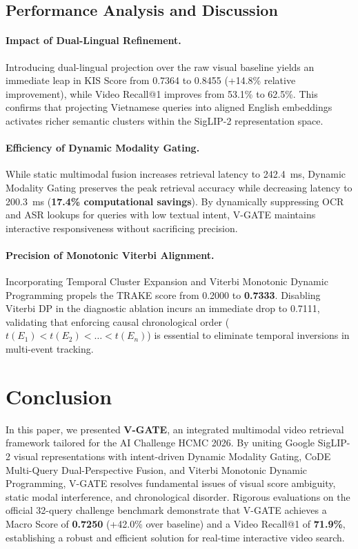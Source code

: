 \documentclass[runningheads]{llncs}
\begin{document}
\subsection{Performance Analysis and Discussion}
\paragraph{Impact of Dual-Lingual Refinement.} Introducing dual-lingual projection over the raw visual baseline yields an immediate leap in KIS Score from 0.7364 to 0.8455 (+14.8\% relative improvement), while Video Recall@1 improves from 53.1\% to 62.5\%. This confirms that projecting Vietnamese queries into aligned English embeddings activates richer semantic clusters within the SigLIP-2 representation space.

\paragraph{Efficiency of Dynamic Modality Gating.} While static multimodal fusion increases retrieval latency to 242.4~ms, Dynamic Modality Gating preserves the peak retrieval accuracy while decreasing latency to 200.3~ms (\textbf{17.4\% computational savings}). By dynamically suppressing OCR and ASR lookups for queries with low textual intent, V-GATE maintains interactive responsiveness without sacrificing precision.

\paragraph{Precision of Monotonic Viterbi Alignment.} Incorporating Temporal Cluster Expansion and Viterbi Monotonic Dynamic Programming propels the TRAKE score from 0.2000 to \textbf{0.7333}. Disabling Viterbi DP in the diagnostic ablation incurs an immediate drop to 0.7111, validating that enforcing causal chronological order ($t(E_1) < t(E_2) < \dots < t(E_n)$) is essential to eliminate temporal inversions in multi-event tracking.

%
%
\section{Conclusion}
\label{sec:conclusion}

In this paper, we presented \textbf{V-GATE}, an integrated multimodal video retrieval framework tailored for the AI Challenge HCMC 2026. By uniting Google SigLIP-2 visual representations with intent-driven Dynamic Modality Gating, CoDE Multi-Query Dual-Perspective Fusion, and Viterbi Monotonic Dynamic Programming, V-GATE resolves fundamental issues of visual score ambiguity, static modal interference, and chronological disorder. Rigorous evaluations on the official 32-query challenge benchmark demonstrate that V-GATE achieves a Macro Score of \textbf{0.7250} (+42.0\% over baseline) and a Video Recall@1 of \textbf{71.9\%}, establishing a robust and efficient solution for real-time interactive video search.

%
%


\end{document}
